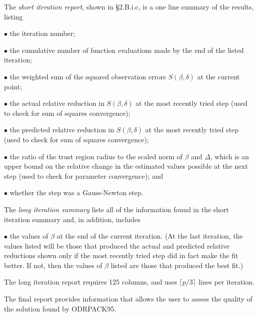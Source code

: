 \noindent The {\it short iteration report}, shown in \S 2.B.i.c, is a one line summary of the results, listing
\item{$\bullet$} the iteration number;
\item{$\bullet$} the cumulative number of function evaluations made by the end of the listed iteration;
\item{$\bullet$} the weighted sum of the squared observation errors $S(\beta,\delta)$ at the current point;
\item{$\bullet$} the actual relative reduction in $S(\beta,\delta)$ at the most recently tried step (used to check for sum of squares convergence);
\item{$\bullet$} the predicted relative reduction in $S(\beta,\delta)$ at the most recently tried step (used to check for sum of squares convergence);
\item{$\bullet$} the ratio of the trust region radius to the scaled norm of $\beta$ and $\Delta$, which is an upper bound on the relative change in the estimated values possible at the next step (used to check for parameter convergence); and
\item{$\bullet$} whether the step was a Gauss-Newton step.

\noindent The {\it long iteration summary} lists all of the information found in the short iteration summary and, in addition, includes
\item{$\bullet$} the values of $\beta$ at the end of the current iteration. (At the last iteration, the values listed will be those that produced the actual and predicted relative reductions shown only if the most recently tried step did in fact make the fit better. If not, then the values of $\beta$ listed are those that produced the best fit.)

\noindent The long iteration report requires 125 columns, and uses $\lceil
p/3\rceil$ lines per iteration.

\bigskip{}
\medskip
\noindent The final report provides information that allows the user to assess
the quality of the solution found by ODRPACK95.

